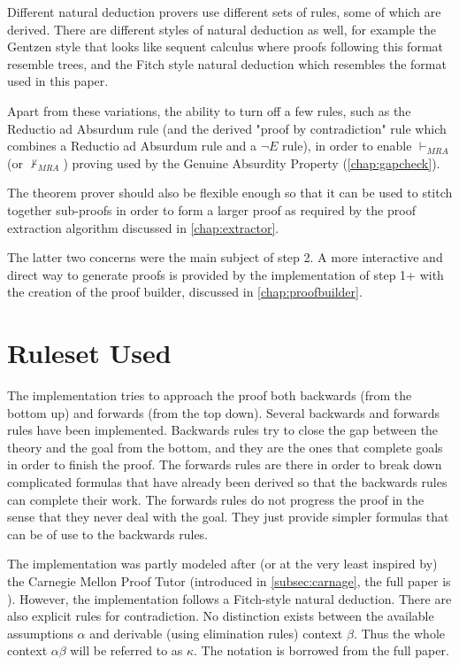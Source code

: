 \documentclass[11pt,twoside,a4paper]{report}
\begin{document}
Different natural deduction provers use different sets of rules, some of which are derived. There are different styles of natural deduction as well, for example the Gentzen style that looks like sequent calculus where proofs following this format resemble trees, and the Fitch style natural deduction which resembles the format used in this paper. 

Apart from these variations, the ability to turn off a few rules, such as the Reductio ad Absurdum rule (and the derived "proof by contradiction" rule which combines a Reductio ad Absurdum rule and a $\neg E$ rule), in order to enable $\vdash_{MRA}$ (or $\nvdash_{MRA}$) proving used by the Genuine Absurdity Property (\autoref{chap:gapcheck}).

The theorem prover should also be flexible enough so that it can be used to stitch together sub-proofs in order to form a larger proof as required by the proof extraction algorithm discussed in \autoref{chap:extractor}.

The latter two concerns were the main subject of step 2. A more interactive and direct way to generate proofs is provided by the implementation of step 1+ with the creation of the proof builder, discussed in \autoref{chap:proofbuilder}.

\section{Ruleset Used}
\label{sec:ruleset}
The implementation tries to approach the proof both backwards (from the bottom up) and forwards (from the top down). Several backwards and forwards rules have been implemented. Backwards rules try to close the gap between the theory and the goal from the bottom, and they are the ones that complete goals in order to finish the proof. The forwards rules are there in order to break down complicated formulas that have already been derived so that the backwards rules can complete their work. The forwards rules do not progress the proof in the sense that they never deal with the goal. They just provide simpler formulas that can be of use to the backwards rules.

The implementation was partly modeled after (or at the very least inspired by) the Carnegie Mellon Proof Tutor (introduced in \autoref{subsec:carnage}, the full paper is \citep{siegfried}). However, the implementation follows a Fitch-style natural deduction. There are also explicit rules for contradiction. No distinction exists between the available assumptions $\alpha$ and derivable (using elimination rules) context $\beta$. Thus the whole context $\alpha\beta$ will be referred to as $\kappa$. The notation is borrowed from the full paper.
\end{document}
